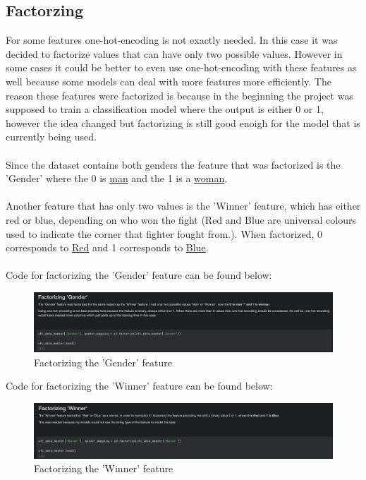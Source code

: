 \documentclass{article}
\begin{document}
  \subsection{Factorzing}
  For some features one-hot-encoding is not exactly needed. In this case it was decided to factorize values that can have only two possible values. However in some cases 
  it could be better to even use one-hot-encoding with these features as well because some models can deal with more features more efficiently. The reason these features were 
  factorized is because in the beginning the project was supposed to train a classification model where the output is either 0 or 1, however the idea changed but factorizing is still 
  good enoigh for the model that is currently being used.\\\\ 
  Since the dataset contains both genders the feature that was factorized is the 'Gender' where the 0 is \underline{man} and the 1 is a \underline{woman}.\\\\
  Another feature that has only two values is the 'Winner' feature, which has either red or blue, depending on who won the fight (Red and Blue are universal colours used to indicate the 
  corner that fighter fought from.). When factorized, 0 corresponds to \underline{Red} and 1 corresponds to \underline{Blue}. \\\\ 
  Code for factorizing the 'Gender' feature can be found below:\\
  \begin{figure}[H]
  	\centering
  	\includegraphics[width=1\textwidth]{images/Factorizing_Gender.png}
  	\caption{Factorizing the 'Gender' feature}
  \end{figure}
  Code for factorizing the 'Winner' feature can be found below:\\
  \begin{figure}[H]
  	\centering
  	\includegraphics[width=1\textwidth]{images/Factorizing_Winner.png}
  	\caption{Factorizing the 'Winner' feature}
  	\label{fig:factorizing_winner}
  \end{figure}
\end{document}
